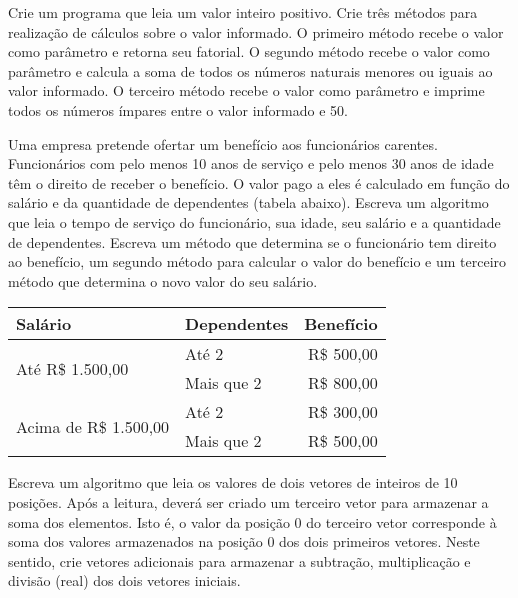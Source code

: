 \begin{exercise}[Calculos]
Crie um programa que leia um valor inteiro positivo. Crie três métodos para realização de cálculos sobre o valor informado. O primeiro método recebe o valor como parâmetro e retorna seu fatorial. O segundo método recebe o valor como parâmetro e calcula a soma de todos os números naturais menores ou iguais ao valor informado. O terceiro método recebe o valor como parâmetro e imprime todos os números ímpares entre o valor informado e 50.
\end{exercise}

\begin{exercise}[BeneficioFuncionarios]
Uma empresa pretende ofertar um benefício aos funcionários carentes. Funcionários com pelo menos 10 anos de serviço e pelo menos 30 anos de idade têm o direito de receber o benefício. O valor pago a eles é calculado em função do salário e da quantidade de dependentes (tabela abaixo). Escreva um algoritmo que leia o tempo de serviço do funcionário, sua idade, seu salário e a quantidade de dependentes. Escreva um método que determina se o funcionário tem direito ao benefício, um segundo método para calcular o valor do benefício e um terceiro método que determina o novo valor do seu salário.

\begin{table}[]
	\centering
	\begin{tabular}{llr}
		\hline
		\textbf{Salário}                       & \textbf{Dependentes} & \textbf{Benefício} \\ \hline
		\multirow{2}{*}{Até R\$ 1.500,00}      & Até 2                & R\$ 500,00         \\
		& Mais que 2           & R\$ 800,00         \\ \hline
		\multirow{2}{*}{Acima de R\$ 1.500,00} & Até 2                & R\$ 300,00         \\
		& Mais que 2           & R\$ 500,00         \\ \hline
	\end{tabular}
\end{table}

\end{exercise}

\begin{exercise}[OperacoesVetores]
Escreva um algoritmo que leia os valores de dois vetores de inteiros de 10 posições. Após a leitura, deverá ser criado um terceiro vetor para armazenar a soma dos elementos. Isto é, o valor da posição 0 do terceiro vetor corresponde à soma dos valores armazenados na posição 0 dos dois primeiros vetores. Neste sentido, crie vetores adicionais para armazenar a subtração, multiplicação e divisão (real) dos dois vetores iniciais.
\end{exercise}

